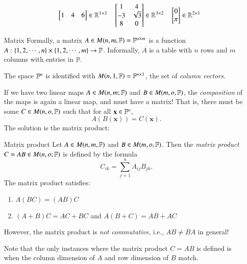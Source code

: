 \begin{myExample}{}{}
\begin{equation}
     \quad \begin{bmatrix} 1 & 4 & 6 \end{bmatrix} \in \mathbb{R}^{1\times 3} \quad \begin{bmatrix} 1 & 4 \\ -3 & \sqrt{3} \\ 8 & 0 \end{bmatrix} \in \mathbb{R}^{3\times 2} \quad \begin{bmatrix} 0 \\  \pi \end{bmatrix}  \in \mathbb{R}^{2\times 1}
\end{equation}
\end{myExample}

\begin{myDefinition}{Matrix}{} Formally, a matrix $A \in M(n,m,\mathbb{F}) = \mathbb{F}^{n\times m}$ is a function $A : \{1,2,\cdots, n\} \times \{1,2,\cdots,m\} \to \mathbb{F}$. Informally, $A$ is a table with $n$ rows and $m$ columns with entries in $\mathbb{F}$.

The space $\mathbb{F}^n$ is identified with $M(n,1,\mathbb{F}) = \mathbb{F}^{n \times 1}$, the set of \emph{column vectors}.
\end{myDefinition}


If we have two linear maps $A \in M(n,m;\mathbb{F})$ and $B\in M(m,o,\mathbb{F})$, the \emph{composition} of the maps is again a linear map, and must have a matrix! That is, there must be some $C \in M(n,o,\mathbb{F})$ such that for all $\mathbf{x} \in \mathbb{F}^o$,
\begin{equation}
    A(B(\mathbf{x})) = C(\mathbf{x}).
\end{equation}
The solution is the matrix product:
\begin{myDefinition}{Matrix product}{}
    Let $A \in M(n,m,\mathbb{F})$ and $B \in M(m,o,\mathbb{F})$. Then the \emph{matrix product} $C = AB \in M(n,o;\mathbb{F})$ is defined by the formula
    \begin{equation}
        C_{ik} = \sum_{j=1}^n A_{ij} B_{jk}.
    \end{equation}
    The matrix product satisfies:
    \begin{enumerate}
        \item $A(BC) = (AB)C$ 
        \item $(A+B)C = AC + BC$ and $A(B+C) = AB + AC$ 
    \end{enumerate}
    However, the matrix product is \emph{not commutative}, i.e., $AB\neq BA$ in general!
 \end{myDefinition}
Note that the only instances where the matrix product $C = AB$ is defined is when the column dimension of $A$ and row dimension of $B$ match. 

